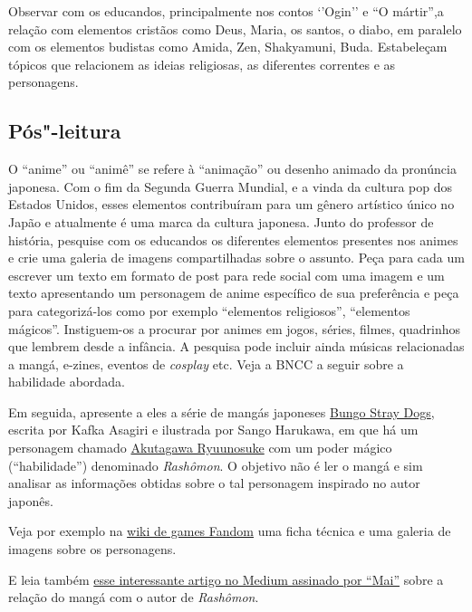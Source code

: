 \documentclass[12pt]{extarticle}
\begin{document}
Observar com os educandos, principalmente nos contos `'Ogin'' e ``O mártir'',a relação
com elementos cristãos como Deus, Maria, os santos, o diabo, em paralelo com os
elementos budistas como Amida, Zen, Shakyamuni, Buda.  Estabeleçam tópicos que
relacionem as ideias religiosas, as diferentes correntes e as personagens.

\subsection{Pós"-leitura}

O ``anime'' ou ``animê'' se refere à ``animação'' ou desenho animado
da pronúncia japonesa. Com o fim da Segunda Guerra Mundial, e a vinda da
cultura pop dos Estados Unidos, esses elementos contribuíram para um gênero
artístico único no Japão e atualmente é uma marca da cultura japonesa. Junto do 
professor de história, pesquise 
com os educandos os diferentes elementos presentes nos
animes e crie uma galeria de imagens compartilhadas sobre o assunto. 
Peça para cada um escrever um texto em formato de post para rede social
com uma imagem e um texto apresentando um personagem de anime específico de 
sua preferência e peça para categorizá-los como por exemplo
``elementos religiosos'', ``elementos mágicos''. 
Instiguem-os a procurar por animes em jogos, séries, filmes, quadrinhos que 
lembrem desde a infância. A pesquisa pode incluir ainda músicas relacionadas 
a mangá, e-zines, eventos de \textit{cosplay} etc.
Veja a BNCC a seguir sobre a habilidade abordada.

Em seguida, apresente a eles a série de mangás 
japoneses \href{https://pt.wikipedia.org/wiki/Bungo_Stray_Dogs}{Bungo Stray Dogs}, escrita por 
Kafka Asagiri e ilustrada por Sango Harukawa, em que há um personagem chamado 
\href{https://villains.fandom.com/wiki/Akutagawa_Ryuunosuke}{Akutagawa Ryuunosuke}
com um poder mágico (``habilidade'') denominado \textit{Rashômon}. 
O objetivo não é ler o mangá e sim analisar as informações obtidas sobre o 
tal personagem inspirado no autor japonês. 

Veja por exemplo na \href{https://villains.fandom.com/wiki/Akutagawa_Ryuunosuke}{wiki de games Fandom}  
uma ficha técnica e uma galeria de imagens sobre os personagens. 

E leia também 
\href{https://bungakunerd.medium.com/ryunosuke-akutagawa-de-escritor-solit\%C3\%A1rio-a-mafioso-desalmado-b9f9dd1f5f39}%
{esse interessante artigo no Medium assinado por ``Mai''} 
sobre a relação do mangá com o autor de \textit{Rashômon}. 
\end{document}
